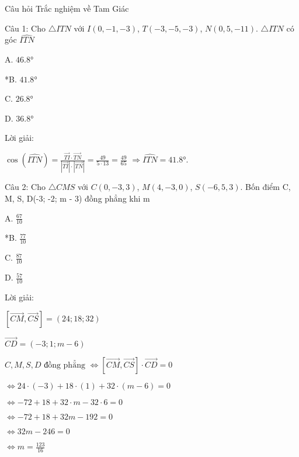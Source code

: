 \documentclass[a4paper,12pt]{article}
\begin{document}
Câu hỏi Trắc nghiệm về Tam Giác

Câu 1: Cho \( \triangle ITN \) với \( I(0, -1, -3) \), \( T(-3, -5, -3) \), \( N(0, 5, -11) \). \( \triangle ITN \) có góc \( \widehat{ITN} \)

A. \( 46.8° \)

*B. \( 41.8° \)

C. \( 26.8° \)

D. \( 36.8° \)

Lời giải:

\( \cos(\widehat{ITN}) = \frac{\overrightarrow{TI} \cdot \overrightarrow{TN}}{|\overrightarrow{TI}| \cdot |\overrightarrow{TN}|} = \frac{49}{5 \cdot 13} = \frac{49}{65} \) \( \Rightarrow \widehat{ITN} = 41.8° \).

Câu 2: Cho \( \triangle CMS \) với \( C(0, -3, 3) \), \( M(4, -3, 0) \), \( S(-6, 5, 3) \). Bốn điểm C, M, S, D(-3; -2; m - 3) đồng phẳng khi m

A. \( \frac{67}{10} \)

*B. \( \frac{77}{10} \)

C. \( \frac{87}{10} \)

D. \( \frac{57}{10} \)

Lời giải:

\([\overrightarrow{CM}, \overrightarrow{CS}] = (24; 18; 32)\)

\(\overrightarrow{CD} = (-3; 1; m - 6)\)

\(C, M, S, D \text{ đồng phẳng } \Leftrightarrow [\overrightarrow{CM}, \overrightarrow{CS}] \cdot \overrightarrow{CD} = 0\)

\(\Leftrightarrow 24 \cdot (-3) + 18 \cdot (1) + 32 \cdot (m - 6) = 0\)

\(\Leftrightarrow -72 + 18 + 32 \cdot m - 32 \cdot 6 = 0\)

\(\Leftrightarrow -72 + 18 + 32m - 192 = 0\)

\(\Leftrightarrow 32m - 246 = 0\)

\(\Leftrightarrow m = \frac{123}{16}\)
\end{document}
